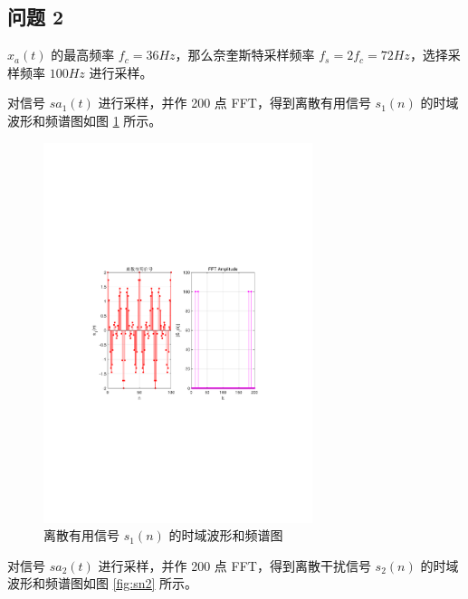 \documentclass[12pt,AutoFakeBold]{article}
\begin{document}
\subsection{问题 2}

$x_a(t)$ 的最高频率 $f_{c}=36Hz$，那么奈奎斯特采样频率 $f_{s}=2f_{c}=72Hz$，选择采样频率 $100Hz$ 进行采样。

对信号 $sa_1(t)$ 进行采样，并作 200 点 FFT，得到离散有用信号 $s_1(n)$ 的时域波形和频谱图如图 \ref{fig:sn1} 所示。 

\begin{figure}[htbp]
	\centering
	\includegraphics[width=0.7\textwidth]{figure/sn1.pdf}
	\caption{离散有用信号 $s_1(n)$ 的时域波形和频谱图} \label{fig:sn1}
\end{figure}

对信号 $sa_2(t)$ 进行采样，并作 200 点 FFT，得到离散干扰信号 $s_2(n)$ 的时域波形和频谱图如图 \ref{fig:sn2} 所示。 
\end{document}

